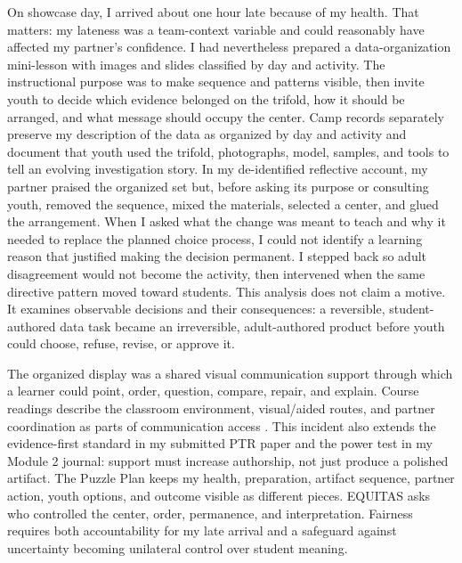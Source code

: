 \documentclass[11pt]{article}
\newcommand{\reviewsection}[1]{%
  \Needspace{4\baselineskip}
  \vspace{0.08in}\noindent{\normalsize\bfseries\color{PrimaryRed}#1}
  \par\vspace{0.025in}
}
\begin{document}
\vspace{-0.5cm}
\reviewsection{Adult Partner Practice as Communication Access}
\vspace{-0.2cm}
On showcase day, I arrived about one hour late because of my health. That matters: my lateness was a team-context variable and could reasonably have affected my partner's confidence. I had nevertheless prepared a data-organization mini-lesson with images and slides classified by day and activity. The instructional purpose was to make sequence and patterns visible, then invite youth to decide which evidence belonged on the trifold, how it should be arranged, and what message should occupy the center. Camp records separately preserve my description of the data as organized by day and activity and document that youth used the trifold, photographs, model, samples, and tools to tell an evolving investigation story. In my de-identified reflective account, my partner praised the organized set but, before asking its purpose or consulting youth, removed the sequence, mixed the materials, selected a center, and glued the arrangement. When I asked what the change was meant to teach and why it needed to replace the planned choice process, I could not identify a learning reason that justified making the decision permanent. I stepped back so adult disagreement would not become the activity, then intervened when the same directive pattern moved toward students. This analysis does not claim a motive. It examines observable decisions and their consequences: a reversible, student-authored data task became an irreversible, adult-authored product before youth could choose, refuse, revise, or approve it.

The organized display was a shared visual communication support through which a learner could point, order, question, compare, repair, and explain. Course readings describe the classroom environment, visual/aided routes, and partner coordination as parts of communication access \citep{downing2015classroom,mirenda2015aids,norrie2021context}. This incident also extends the evidence-first standard in my submitted PTR paper and the power test in my Module 2 journal: support must increase authorship, not just produce a polished artifact. The Puzzle Plan keeps my health, preparation, artifact sequence, partner action, youth options, and outcome visible as different pieces. EQUITAS asks who controlled the center, order, permanence, and interpretation. Fairness requires both accountability for my late arrival and a safeguard against uncertainty becoming unilateral control over student meaning.
\end{document}
